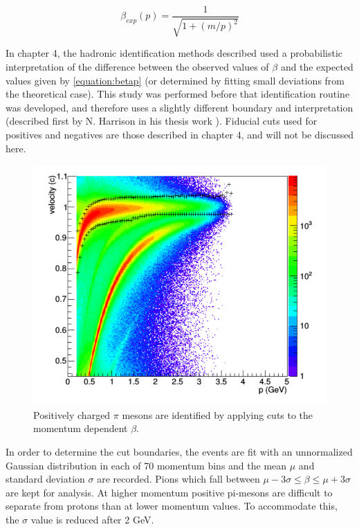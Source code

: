 \begin{equation}
	\label{equation:betap}
	\beta_{exp} (p) = \frac{1}{\sqrt{1 + (m/p)^2}}
\end{equation}

In chapter 4, the hadronic identification methods described used a probabilistic interpretation of the difference between the observed values of $\beta$ and the expected values given by \ref{equation:betap} (or determined by fitting small deviations from the theoretical case).  This study was performed before that identification routine was developed, and therefore uses a slightly different boundary and interpretation (described first by N. Harrison in his thesis work \cite{theses-harrison:2015}).  Fiducial cuts used for positives and negatives are those described in chapter 4, and will not be discussed here.  \\

\begin{figure}
  \centering
  \includegraphics[width=\textwidth]{image/plots/sidis/nathan-pip.png}
  \caption[PID for $\pi^+$ used for the SIDIS analysis]{Positively charged $\pi$ mesons are identified by applying cuts to the momentum dependent $\beta$.}
\end{figure}

In order to determine the cut boundaries, the events are fit with an unnormalized Gaussian distribution in each of 70 momentum bins and the mean $\mu$ and standard deviation $\sigma$ are recorded.  Pions which fall between $\mu - 3\sigma \leq \beta \leq \mu + 3 \sigma$ are kept for analysis.  At higher momentum positive pi-mesons are difficult to separate from protons than at lower momentum values.  To accommodate this, the $\sigma$ value is reduced after 2 GeV.  \\

